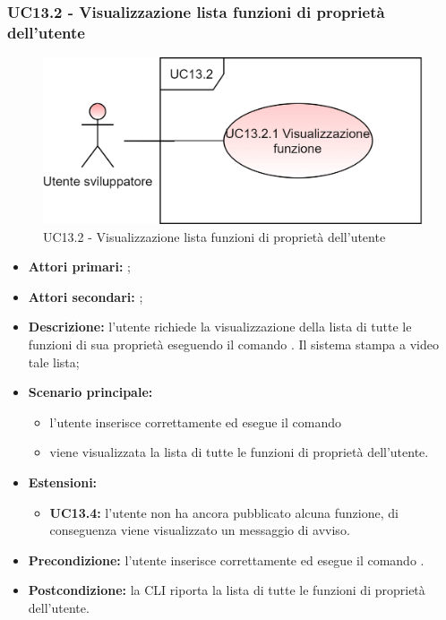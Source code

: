 \subsubsection{UC13.2 - Visualizzazione lista funzioni di proprietà dell’utente}
\begin{figure}[h]
	\centering
	\includegraphics[scale=\ucs]{./res/img/UC13.2.png}
	\caption {UC13.2 - Visualizzazione lista funzioni di proprietà dell’utente}
\end{figure}
\begin{itemize}
	\item \textbf{Attori primari:} \us{};
	\item \textbf{Attori secondari:} \re{};
	\item \textbf{Descrizione:} l’utente richiede la visualizzazione della lista di tutte le funzioni di sua proprietà eseguendo il comando \plista{}. Il sistema stampa a video tale lista;
	\item \textbf{Scenario principale:} 
	\begin{itemize}
		\item l’utente inserisce correttamente ed esegue il comando \plista{}  
		\item viene visualizzata la lista di tutte le funzioni di proprietà dell’utente. 
	\end{itemize}
	\item \textbf{Estensioni:} 
	\begin{itemize}
		\item \textbf{UC13.4:} l’utente non ha ancora pubblicato alcuna funzione, di conseguenza viene visualizzato un messaggio di avviso. 
	\end{itemize}
	\item \textbf{Precondizione:} l'utente inserisce correttamente ed esegue il comando \plista{}.
	\item \textbf{Postcondizione:} la CLI riporta la lista di tutte le funzioni di proprietà dell’utente. 
\end{itemize}